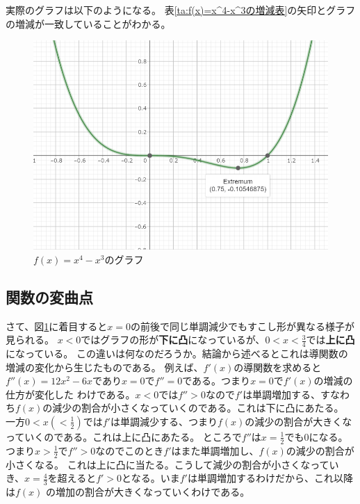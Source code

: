\documentclass[a4j,dvipdfmx]{jsarticle}
\begin{document}
                    実際のグラフは以下のようになる。
                    表\ref{ta:f(x)=x^4-x^3の増減表}の矢印とグラフの増減が一致していることがわかる。
                    \begin{figure}[h]
                        \centering
                        \includegraphics[scale=0.4]{img/QuuNote/x^4-x^3Graph.png}
                        \caption{$f(x)=x^4-x^3$のグラフ}\label{fig:x^4-x^3グラフ}
                    \end{figure}
                \clearpage
                \subsection{関数の変曲点}
                    さて、図\ref{fig:x^4-x^3グラフ}に着目すると$x=0$の前後で同じ単調減少でもすこし形が異なる様子が見られる。
                    $x<0$ではグラフの形が\textbf{下に凸}になっているが、$0<x<\frac{3}{4}$では\textbf{上に凸}になっている。
                    この違いは何なのだろうか。結論から述べるとこれは導関数の増減の変化から生じたものである。
                    例えば、$f'(x)$の導関数を求めると$f''(x)=12x^2-6x$であり$x=0$で$f''=0$である。つまり$x=0$で$f'(x)$の増減の仕方が変化した
                    わけである。$x<0$では$f''>0$なので$f'$は単調増加する、すなわち$f(x)$の減少の割合が小さくなっていくのである。これは下に凸にあたる。
                    一方$0<x(<\frac{1}{2})$では$f'$は単調減少する、つまり$f(x)$の減少の割合が大きくなっていくのである。これは上に凸にあたる。
                    ところで$f''$は$x=\frac{1}{2}$でも$0$になる。つまり$x>\frac{1}{2}$で$f''>0$なのでこのとき$f'$はまた単調増加し、$f(x)$の減少の割合が小さくなる。
                    これは上に凸に当たる。こうして減少の割合が小さくなっていき、$x=\frac{4}{3}$を超えると$f'>0$となる。いま$f'$は単調増加するわけだから、これ以降は$f(x)$
                    の増加の割合が大きくなっていくわけである。
\end{document}
